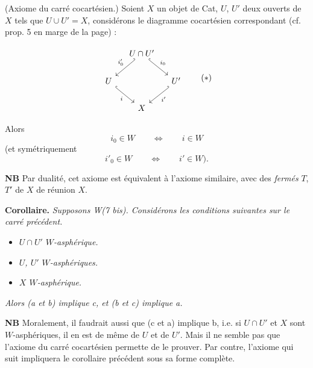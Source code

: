 \documentclass[11pt]{article}
\newcommand{\printedpage}[1]{\marginpar{\footnotesize p.~#1}}
\newcommand{\msp}[1]{\marginpar{\footnotesize [#1]}}
\begin{document}
\begin{description}[leftmargin=5em, style=nextline]
\item[W(7 bis)] (Axiome du carré cocartésien.) Soient $X$ un objet de Cat, $U$, $U'$ deux ouverts de $X$ tels que $U\cup U'=X$, considérons le diagramme cocartésien correspondant (cf. prop. 5 en marge de la page) :

\msp{page 76}
\[
\begin{tikzcd}[column sep=small]
& U\cap U' \arrow[dl, hook', "i'_0"'] \arrow[dr, hook, "i_0"] & \\
U \arrow[dr, hook, "i"'] & & U' \arrow[dl, hook', "i'"] \\
& X &
\end{tikzcd}
\tag*{$(*)$}
\]

Alors
\[
i_0\in W\qquad\Longleftrightarrow\qquad i\in W
\]
(et symétriquement
\[
i'_0\in W\qquad\Longleftrightarrow\qquad i'\in W).
\]
\end{description}

\textbf{NB} Par dualité, cet axiome est équivalent à l'axiome similaire, avec des \textit{fermés} $T$, $T'$ de $X$ de réunion $X$.

\textbf{Corollaire.} \textit{Supposons \textup{W(7 bis)}. Considérons les conditions suivantes sur le carré précédent.}

\begin{itemize}
\item[\textit{a)}] \textit{$U\cap U'$ $W$-asphérique.}
\item[\textit{b)}] \textit{$U$, $U'$ $W$-asphériques.}
\item[\textit{c)}] \textit{$X$ $W$-asphérique.}
\end{itemize}

\textit{Alors (a et b) implique c, et (b et c) implique a.}

\textbf{NB} Moralement, il faudrait aussi que (c et a) implique b, i.e. si $U\cap U'$ et $X$ sont $W$-asphériques, il en est de même de $U$ et de $U'$. Mais il ne semble pas que l'axiome du carré cocartésien permette de le prouver. Par contre, l'axiome qui suit impliquera le corollaire précédent sous sa forme complète.

\printedpage{56}
\end{document}
